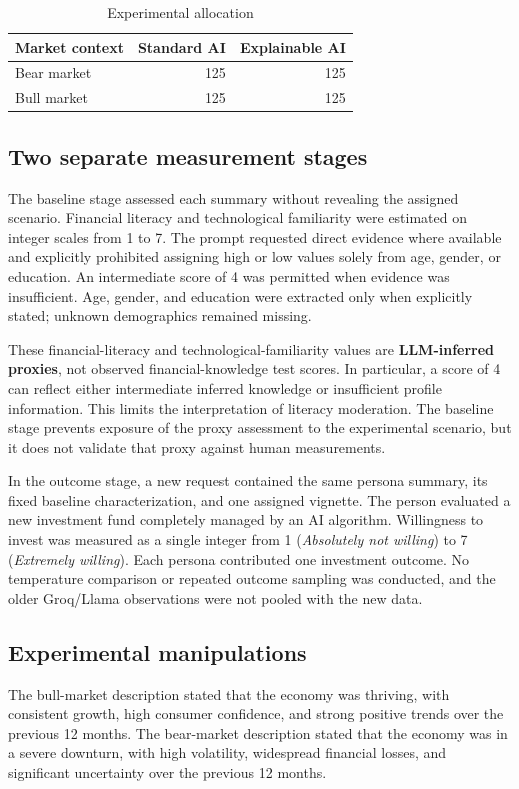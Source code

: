\documentclass[11pt,a4paper]{article}
\begin{document}
\begin{table}[htbp]
\centering
\caption{Experimental allocation}
\begin{tabular}{lrr}
\toprule
Market context & Standard AI & Explainable AI\\
\midrule
Bear market & 125 & 125\\
Bull market & 125 & 125\\
\bottomrule
\end{tabular}
\end{table}

\subsection{Two separate measurement stages}
The baseline stage assessed each summary without revealing the assigned scenario. Financial literacy and technological familiarity were estimated on integer scales from 1 to 7. The prompt requested direct evidence where available and explicitly prohibited assigning high or low values solely from age, gender, or education. An intermediate score of 4 was permitted when evidence was insufficient. Age, gender, and education were extracted only when explicitly stated; unknown demographics remained missing.

These financial-literacy and technological-familiarity values are \textbf{LLM-inferred proxies}, not observed financial-knowledge test scores. In particular, a score of 4 can reflect either intermediate inferred knowledge or insufficient profile information. This limits the interpretation of literacy moderation. The baseline stage prevents exposure of the proxy assessment to the experimental scenario, but it does not validate that proxy against human measurements.

In the outcome stage, a new request contained the same persona summary, its fixed baseline characterization, and one assigned vignette. The person evaluated a new investment fund completely managed by an AI algorithm. Willingness to invest was measured as a single integer from 1 (\textit{Absolutely not willing}) to 7 (\textit{Extremely willing}). Each persona contributed one investment outcome. No temperature comparison or repeated outcome sampling was conducted, and the older Groq/Llama observations were not pooled with the new data.

\subsection{Experimental manipulations}
The bull-market description stated that the economy was thriving, with consistent growth, high consumer confidence, and strong positive trends over the previous 12 months. The bear-market description stated that the economy was in a severe downturn, with high volatility, widespread financial losses, and significant uncertainty over the previous 12 months.
\end{document}
